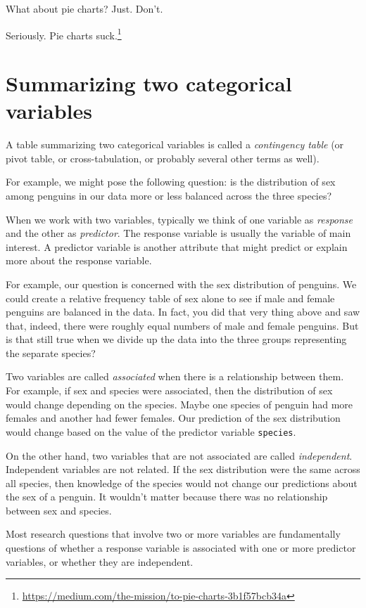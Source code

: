 \documentclass[
]{book}
\begin{document}
What about pie charts? Just. Don't.

Seriously. Pie charts suck.\footnote{\url{https://medium.com/the-mission/to-pie-charts-3b1f57bcb34a}}

\hypertarget{categorical-summarizing-two}{%
\section{Summarizing two categorical variables}\label{categorical-summarizing-two}}

A table summarizing two categorical variables is called a \emph{contingency table} (or pivot table, or cross-tabulation, or probably several other terms as well).

For example, we might pose the following question: is the distribution of sex among penguins in our data more or less balanced across the three species?

When we work with two variables, typically we think of one variable as \emph{response} and the other as \emph{predictor}. The response variable is usually the variable of main interest. A predictor variable is another attribute that might predict or explain more about the response variable.

For example, our question is concerned with the sex distribution of penguins. We could create a relative frequency table of sex alone to see if male and female penguins are balanced in the data. In fact, you did that very thing above and saw that, indeed, there were roughly equal numbers of male and female penguins. But is that still true when we divide up the data into the three groups representing the separate species?

Two variables are called \emph{associated} when there is a relationship between them. For example, if sex and species were associated, then the distribution of sex would change depending on the species. Maybe one species of penguin had more females and another had fewer females. Our prediction of the sex distribution would change based on the value of the predictor variable \texttt{species}.

On the other hand, two variables that are not associated are called \emph{independent}. Independent variables are not related. If the sex distribution were the same across all species, then knowledge of the species would not change our predictions about the sex of a penguin. It wouldn't matter because there was no relationship between sex and species.

Most research questions that involve two or more variables are fundamentally questions of whether a response variable is associated with one or more predictor variables, or whether they are independent.
\end{document}
